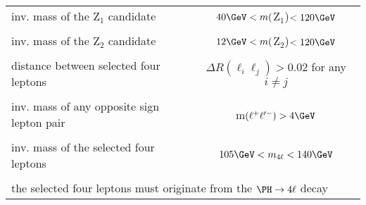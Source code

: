 \begin{table}[!h!tb]
\begin{center}
\begin{tabular}{|lc|}
			inv. mass of the Z$_1$ candidate & $40 \GeV < m($Z$_{1}$)$< 120 \GeV$ \\ 
			\vspace{-0.4cm} & \\
			inv. mass of the Z$_2$ candidate & $12 \GeV < m($Z$_{2}$)$< 120 \GeV$ \\ 
			\vspace{-0.4cm} & \\
			distance between selected four leptons & $\Delta R(\ell_{i}\ell_{j})>0.02$ for any $i\neq j$  \\ 
			\vspace{-0.4cm} & \\
			inv. mass of any opposite sign lepton pair & m$(\ell^{+}\ell'^{-})>4 \GeV$ \\ 
			\vspace{-0.4cm} & \\
			inv. mass of the selected four leptons & $105 \GeV < m_{4\ell} < 140 \GeV$  \\ 
			\vspace{-0.4cm} & \\
			\multicolumn{2}{|l|}{the selected four leptons must originate from the $\Hllll$ decay} \\
			\hline %
			\hline %
		\end{tabular}
		\normalsize
	\end{center}
\end{table}

